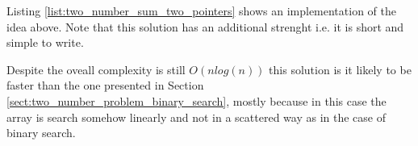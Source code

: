 Listing \ref{list:two_number_sum_two_pointers} shows an implementation of the idea above.  Note that
this solution has an additional strenght i.e.  it is short and simple to write. 



Despite the oveall complexity is still $O(n log(n))$ this solution is it likely to be faster than
the one presented in Section \ref{sect:two_number_problem_binary_search}, mostly because in this
case the array is search somehow linearly and not in a scattered way as in the case of binary
search.
